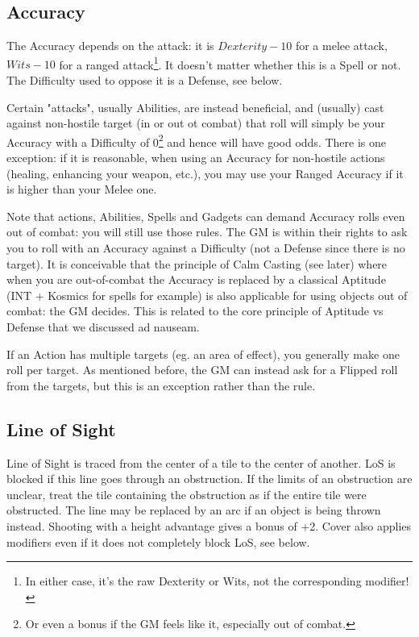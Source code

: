 \subsection{Accuracy}

\label{accuracies}

The Accuracy depends on the attack: it is $Dexterity - 10$ for a melee attack, $Wits-10$ for a ranged attack\footnote{In either case, it's the raw Dexterity or Wits, not the corresponding modifier!}. It doesn't matter whether this is a Spell or not. The Difficulty used to oppose it is a Defense, see below.


Certain "attacks", usually Abilities, are instead beneficial, and (usually) cast against non-hostile target (in or out ot combat) that roll will simply be your Accuracy with a Difficulty of 0\footnote{Or even a bonus if the GM feels like it, especially out of combat.} and hence will have good odds. There is one exception: if it is reasonable, when using an Accuracy for non-hostile actions (healing, enhancing your weapon, etc.), you may use your Ranged Accuracy if it is higher than your Melee one.


Note that actions, Abilities, Spells and Gadgets can demand Accuracy rolls even out of combat: you will still use those rules. The GM is within their rights to ask you to roll with an Accuracy against a Difficulty (not a Defense since there is no target). It is conceivable that the principle of Calm Casting (see later) where when you are out-of-combat the Accuracy is replaced by a classical Aptitude (INT + Kosmics for spells for example) is also applicable for using objects out of combat: the GM decides. This is related to the core principle of Aptitude vs Defense that we discussed ad nauseam.


If an Action has multiple targets (eg. an area of effect), you generally make one roll per target. As mentioned before, the GM can instead ask for a Flipped roll from the targets, but this is an exception rather than the rule. 


\subsection{Line of Sight}

Line of Sight is traced from the center of a tile to the center of another. LoS is blocked if this line goes through an obstruction. If the limits of an obstruction are unclear, treat the tile containing the obstruction as if the entire tile were obstructed. The line may be replaced by an arc if an object is being thrown instead. Shooting with a height advantage gives a bonus of +2. Cover also applies modifiers even if it does not completely block LoS, see below.

